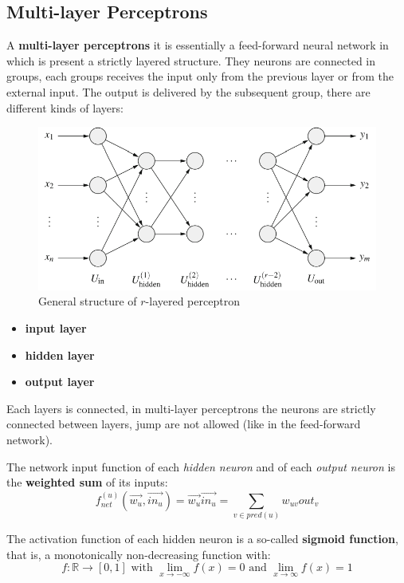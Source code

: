 \documentclass{article}
\begin{document}
\subsection{Multi-layer Perceptrons}
A \textbf{multi-layer perceptrons} it is essentially a feed-forward neural network
in which is present a strictly layered structure. They neurons are connected in groups,
each groups receives the input only from the previous layer or from the external input.
The output is delivered by the subsequent group, there are different kinds of layers:

\begin{figure}[H]
    \centering
    \includegraphics[scale=0.5]{images/multi-layer-percep.png}
    \caption{General structure of $r$-layered perceptron}
\end{figure}

\begin{itemize}
    \item \textbf{input layer}
    \item \textbf{hidden layer}
    \item \textbf{output layer}
\end{itemize}

Each layers is connected, in multi-layer perceptrons the neurons are strictly connected
between layers, jump are not allowed (like in the feed-forward network).

The network input function of each \textit{hidden neuron} and of each \textit{output neuron}
is the \textbf{weighted sum} of its inputs:
$$f_{net}^{(u)}(\vec{w_u},\vec{in_u})=\vec{w_u}\vec{in_u}=\sum_{v\in pred(u)}w_{uv}out_v$$

The activation function of each hidden neuron is a so-called \textbf{sigmoid function},
that is, a monotonically non-decreasing function with:
$$f:\mathbb{R}\rightarrow [0,1]\text{ with }\lim_{x\rightarrow -\infty}f(x)=0\text{ and }\lim_{x\rightarrow\infty}f(x)=1$$
\end{document}
